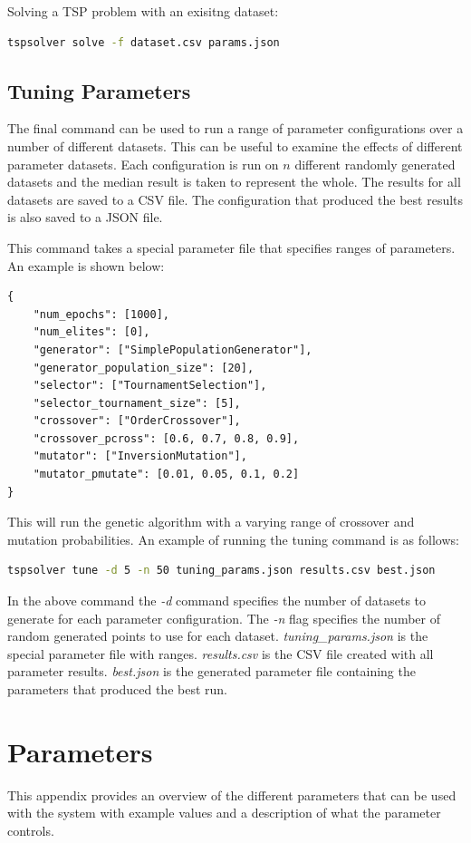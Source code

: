 \documentclass[journal]{IEEEtran}
\begin{document}
Solving a TSP problem with an exisitng dataset:
\begin{lstlisting}[language=Bash]
tspsolver solve -f dataset.csv params.json
\end{lstlisting}

\subsection{Tuning Parameters}
The final command can be used to run a range of parameter configurations over a number of different datasets. This can be useful to examine the effects of different parameter datasets. Each configuration is run on $n$ different randomly generated datasets and the median result is taken to represent the whole. The results for all datasets are saved to a CSV file. The configuration that produced the best results is also saved to a JSON file.

This command takes a special parameter file that specifies ranges of parameters. An example is shown below:

\begin{lstlisting}
{
    "num_epochs": [1000],
    "num_elites": [0],
    "generator": ["SimplePopulationGenerator"],
    "generator_population_size": [20],
    "selector": ["TournamentSelection"],
    "selector_tournament_size": [5],
    "crossover": ["OrderCrossover"],
    "crossover_pcross": [0.6, 0.7, 0.8, 0.9],
    "mutator": ["InversionMutation"],
    "mutator_pmutate": [0.01, 0.05, 0.1, 0.2]
}
\end{lstlisting}

This will run the genetic algorithm with a varying range of crossover and mutation probabilities. An example of running the tuning command is as follows:

\begin{lstlisting}[language=Bash]
tspsolver tune -d 5 -n 50 tuning_params.json results.csv best.json
\end{lstlisting}

In the above command the \textit{-d} command specifies the number of datasets to generate for each parameter configuration. The \textit{-n} flag specifies the number of random generated points to use for each dataset. \textit{tuning\_params.json} is the special parameter file with ranges. \textit{results.csv} is the CSV file created with all parameter results. \textit{best.json} is the generated parameter file containing the parameters that produced the best run.

\clearpage
\onecolumn
\section{Parameters}
\label{appendix:parameters}
This appendix provides an overview of the different parameters that can be used with the system with example values and a description of what the parameter controls.
\end{document}
